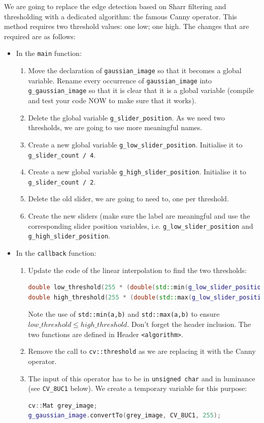 \documentclass[english,a4paper,12pt,oneside]{article}
\begin{document}
We are going to replace the edge detection based on Sharr filtering and thresholding with a dedicated algorithm: the famous Canny operator. This method requires two threshold values: one low; one high. 
The changes that are required are as follows:
\begin{itemize}
\item In the \verb+main+ function:
    \begin{enumerate}
    \item Move the declaration of \verb+gaussian_image+ so that it becomes a global variable. Rename every occurrence of \verb+gaussian_image+ into \verb+g_gaussian_image+ so that it is clear that it is a global variable (compile and test your code NOW to make sure that it works). 
    \item Delete the global variable \verb+g_slider_position+. As we need two thresholds, we are going to use more meaningful names.
    \item Create a new global variable \verb+g_low_slider_position+. Initialise it to \verb+g_slider_count / 4+.
    \item Create a new global variable \verb+g_high_slider_position+. Initialise it to \verb+g_slider_count / 2+.
    \item Delete the old slider, we are going to need to, one per threshold. 
    \item Create the new sliders (make sure the label are meaningful and use the corresponding slider position variables, i.e. \verb+g_low_slider_position+ and \verb+g_high_slider_position+.
    \end{enumerate}
    \item In the \verb+callback+ function:
        \begin{enumerate}
        \item Update the code of the linear interpolation to find the two thresholds:
         \begin{lstlisting}[language=c++]
double low_threshold(255 * (double(std::min(g_low_slider_position,   g_high_slider_position) / double(g_slider_count))));
double high_threshold(255 * (double(std::max(g_low_slider_position, g_high_slider_position) / double(g_slider_count))));
	\end{lstlisting}
	Note the use of \verb+std::min(a,b)+ and \verb+std::max(a,b)+  to ensure 
	$low\_threshold \leq high\_threshold$. Don't forget the header inclusion. The two functions are defined in Header \verb+<algorithm>+.
	\item Remove the call to \verb+cv::threshold+ as we are replacing it with the Canny operator.
	\item The input of this operator has to be in \verb+unsigned char+ and in luminance (see \verb+CV_8UC1+ below). We create a temporary variable for this purpose:
         \begin{lstlisting}[language=c++]
cv::Mat grey_image;
g_gaussian_image.convertTo(grey_image, CV_8UC1, 255);
	\end{lstlisting}


\end{enumerate}
\end{itemize}
\end{document}
